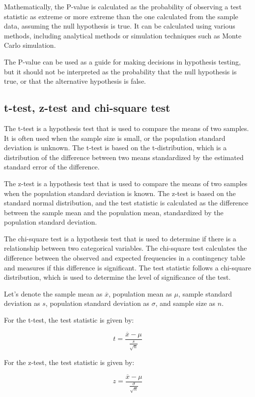 \documentclass[12pt, a4paper, oneside]{article}
\begin{document}
Mathematically, the P-value is calculated as the probability of observing a test statistic as extreme or more extreme than the one calculated from the sample data, assuming the null hypothesis is true. It can be calculated using various methods, including analytical methods or simulation techniques such as Monte Carlo simulation.

The P-value can be used as a guide for making decisions in hypothesis testing, but it should not be interpreted as the probability that the null hypothesis is true, or that the alternative hypothesis is false.
\subsection{ t-test, z-test and chi-square test }

The t-test is a hypothesis test that is used to compare the means of two samples. It is often used when the sample size is small, or the population standard deviation is unknown. The t-test is based on the t-distribution, which is a distribution of the difference between two means standardized by the estimated standard error of the difference.

The z-test is a hypothesis test that is used to compare the means of two samples when the population standard deviation is known. The z-test is based on the standard normal distribution, and the test statistic is calculated as the difference between the sample mean and the population mean, standardized by the population standard deviation.

The chi-square test is a hypothesis test that is used to determine if there is a relationship between two categorical variables. The chi-square test calculates the difference between the observed and expected frequencies in a contingency table and measures if this difference is significant. The test statistic follows a chi-square distribution, which is used to determine the level of significance of the test.

Let's denote the sample mean as $\overline{x}$, population mean as $\mu$, sample standard deviation as $s$, population standard deviation as $\sigma$, and sample size as $n$.

For the t-test, the test statistic is given by:

$$t = \frac{\overline{x} - \mu}{\frac{s}{\sqrt{n}}}$$

For the z-test, the test statistic is given by:

$$z = \frac{\overline{x} - \mu}{\frac{\sigma}{\sqrt{n}}}$$
\end{document}
